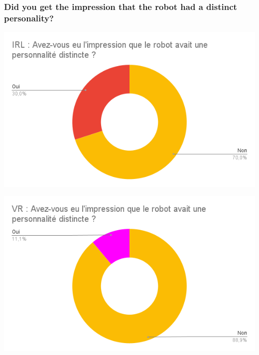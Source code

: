     \subsubsection{Did you get the impression that the robot had a distinct personality?}
    \begin{minipage}{.5\textwidth}%
    \includegraphics[width=\textwidth]{Datas/IRL_personnalite_distincte.png}
    \end{minipage}%
    \begin{minipage}{.5\textwidth}%
    \includegraphics[width=\textwidth]{Datas/VR_personnalite_distincte.png}
    \end{minipage}%
    \vspace*{0.5cm}


